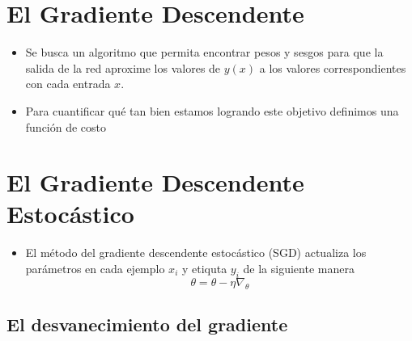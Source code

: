 \section{El Gradiente Descendente}
\begin{frame}{\titulo}{\subtitulo}
    \begin{itemize}
        \item Se busca un algoritmo que permita encontrar pesos y sesgos para que la salida de la red aproxime los valores de $y(x)$ a los valores correspondientes con cada entrada $x$.\bigskip

        \item Para cuantificar qué tan bien estamos logrando este objetivo definimos una función de costo

    \end{itemize}
\end{frame}


\section{El Gradiente Descendente Estocástico}
\begin{frame}{\titulo}{\subtitulo}
    \begin{itemize}
        \item El método del gradiente descendente estocástico (SGD) actualiza los parámetros en cada ejemplo $x_i$ y etiquta $y_i$ de la siguiente manera $$ \theta = \theta - \eta\nabla_\theta $$
    \end{itemize}
\end{frame}



\begin{frame}{\titulo}{\subtitulo}
    \begin{figure}[H]
        \centering
        \scalebox{0.6}{}
    \end{figure}
\end{frame}

\subsection{El desvanecimiento del gradiente}
\begin{frame}{\titulo}{\subtitulo}
	\begin{figure}[H]
        \centering
        \scalebox{0.6}{}
    \end{figure}
\end{frame}
